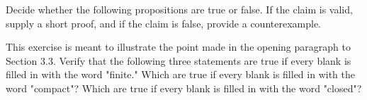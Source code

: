 \begin{solution}
  \enum{
  \item \TODO
  \item \TODO
  \item \TODO
  \item \TODO
  }
\end{solution}

\begin{exercise}
  Decide whether the following propositions are true or false. If the claim is valid, supply a short proof, and if the claim is false, provide a counterexample.
\end{exercise}

\begin{solution}
  \enum{
  \item \TODO
  \item \TODO
  \item \TODO
  \item \TODO
  }
\end{solution}

\begin{exercise}
  This exercise is meant to illustrate the point made in the opening paragraph to Section 3.3. Verify that the following three statements are true if every blank is filled in with the word "finite." Which are true if every blank is filled in with the word "compact"? Which are true if every blank is filled in with the word "closed"?
\end{exercise}

